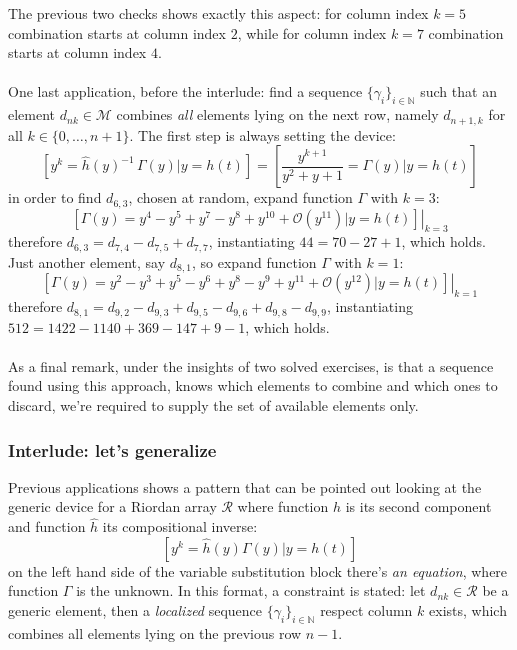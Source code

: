 The previous two checks shows exactly this aspect: for column index $k=5$
combination starts at column index $2$, while for column index $k=7$ combination
starts at column index $4$.
\\\\
One last application, before the interlude: 
find a sequence $\lbrace \gamma_{i} \rbrace_{i\in\mathbb{N}}$ such that 
an element $d_{nk}\in\mathcal{M}$ combines \emph{all} elements lying on 
the next row, namely $d_{n+1,k}$ for all $k\in\lbrace0,\ldots,n+1\rbrace$.
The first step is always setting the device:
\begin{displaymath}
    \left[y^{k} = \hat{h}(y)^{-1}\,\Gamma(y) \big| y = h(t) \right]=
        \left[ \frac{y^{k + 1}}{y^2 + y + 1} = \Gamma(y) \big| y = h(t) \right]
\end{displaymath}
in order to find $d_{6,3}$, chosen at random, expand function $\Gamma$ with $k=3$:
\begin{displaymath}
    \left.\left[\Gamma(y)=y^4 -y^5 + y^7 -y^8 +y^{10} + \mathcal{O}(y^{11}) 
        \big| y = h(t) \right]\right|_{k=3}
\end{displaymath}
therefore $d_{6,3}=d_{7,4} - d_{7,5} + d_{7,7}$, instantiating $44 = 70 -27 +1$, 
which holds. Just another element, say $d_{8,1}$, so expand function 
$\Gamma$ with $k=1$:
\begin{displaymath}
    \left.\left[\Gamma(y)=y^2 -y^3 + y^5 -y^6 + y^8 -y^9 + y^{11} + 
        \mathcal{O}(y^{12}) \big| y = h(t) \right]\right|_{k=1}
\end{displaymath}
therefore $d_{8,1}=d_{9,2} - d_{9,3} + d_{9,5}- d_{9,6}+ d_{9,8}- d_{9,9}$, 
instantiating $512 = 1422 -1140 +369 -147 +9 -1$, which holds.
\\\\
As a final remark, under the insights of two solved exercises, is that a
sequence found using this approach, knows which elements to combine and which
ones to discard, we're required to supply the set of available elements only.


\subsubsection{Interlude: let's generalize}

Previous applications shows a pattern that can be pointed out looking at 
the generic device for a Riordan array $\mathcal{R}$ where 
function $h$ is its second component and function $\hat{h}$ its compositional
inverse:
\begin{displaymath}
    \left[y^{k} = \hat{h}(y) \Gamma(y) \big| y = h(t) \right]
\end{displaymath}
on the left hand side of the variable substitution block there's \emph{an
equation}, where function $\Gamma$ is the unknown. In this format, 
a constraint is stated: let $d_{nk}\in\mathcal{R}$ be a generic element, 
then a \emph{localized} sequence 
$\lbrace \gamma_{i} \rbrace_{i\in\mathbb{N}}$ respect column $k$ exists, which
combines all elements lying on the previous row $n-1$.

